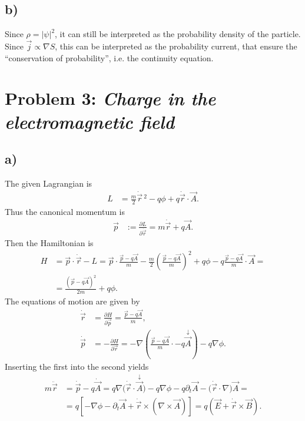 \documentclass[english, parskip=full]{scrartcl}
\newcommand{\kla}{}
\newcommand{\klam}{}
\begin{document}
\subsection*{b)}
Since $\rho=|\psi|^2$, it can still be interpreted as the probability density of the particle.
Since $\vec{j}\propto\nabla S$, this can be interpreted as the probability current, that ensure the ``conservation of probability'', i.e. the continuity equation.

\newpage
\section*{Problem 3: \normalfont\textit{\large{Charge in the electromagnetic field}}}
\subsection*{a)}
The given Lagrangian is 
\begin{align}
L&=\frac{m}{2}\dot{\vec{r}}\,^2-q\phi+q\dot{\vec{r}}\cdot\vec{A}.
\end{align}
Thus the canonical momentum is
\begin{align}
\vec{p}&:=\frac{\partial L}{\partial \dot{\vec{r}}}=m\dot{\vec{r}}+q\vec{A}.
\end{align}
Then the Hamiltonian is
\begin{align}
H&=\vec{p}\cdot\dot{\vec{r}}-L=\vec{p}\cdot\frac{\vec{p}-q\vec{A}}{m}-\frac{m}{2}\kla\left( \frac{\vec{p}-q\vec{A}}{m} \right)^2+q\phi -q\frac{\vec{p}-q\vec{A}}{m}\cdot\vec{A}=\\
&=\frac{\kla\left( \vec{p}-q\vec{A} \right)^2}{2m}+q\phi.
\end{align}
The equations of motion are given by
\begin{align}
\dot{\vec{r}}&=\frac{\partial H}{\partial \vec{p}}=\frac{\vec{p}-q\vec{A}}{m},\\
\dot{\vec{p}}&=-\frac{\partial H}{\partial \vec{r}}=-\nabla\kla\left( \frac{\vec{p}-q\vec{A}}{m}\cdot-q\overset{\downarrow}{\vec{A}} \right)-q\nabla\phi.
\end{align}
Inserting the first into the second yields
\begin{align}
m\ddot{\vec{r}}&=\dot{\vec{p}}-q\dot{\vec{A}}=q\nabla\kla\big( \dot{\vec{r}}\cdot\overset{\downarrow}{\vec{A}} \big)-q\nabla\phi-q\partial_t\vec{A}-\big(\dot{\vec{r}}\cdot \nabla\big)\vec{A}=\\
&=q\klam\left[ -\nabla\phi-\partial_t\vec{A}+\dot{\vec{r}}\times\kla\left( \nabla\times\vec{A} \right) \right]=q\kla\left( \vec{E}+\dot{\vec{r}}\times\vec{B} \right).
\end{align}
\end{document}
